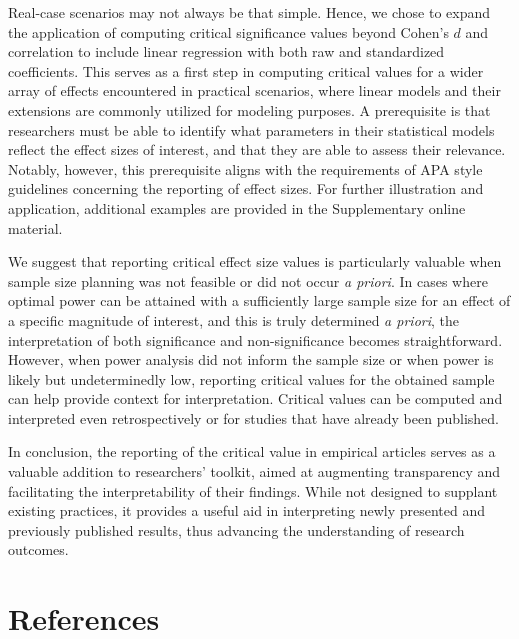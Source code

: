 \documentclass[
  man]{apa7}
\begin{document}
Real-case scenarios may not always be that simple. Hence, we chose to expand the application of computing critical significance values beyond Cohen's \(d\) and correlation to include linear regression with both raw and standardized coefficients. This serves as a first step in computing critical values for a wider array of effects encountered in practical scenarios, where linear models and their extensions are commonly utilized for modeling purposes. A prerequisite is that researchers must be able to identify what parameters in their statistical models reflect the effect sizes of interest, and that they are able to assess their relevance. Notably, however, this prerequisite aligns with the requirements of APA style guidelines concerning the reporting of effect sizes. For further illustration and application, additional examples are provided in the Supplementary online material.

We suggest that reporting critical effect size values is particularly valuable when sample size planning was not feasible or did not occur \textit{a priori}. In cases where optimal power can be attained with a sufficiently large sample size for an effect of a specific magnitude of interest, and this is truly determined \textit{a priori}, the interpretation of both significance and non-significance becomes straightforward. However, when power analysis did not inform the sample size or when power is likely but undeterminedly low, reporting critical values for the obtained sample can help provide context for interpretation. Critical values can be computed and interpreted even retrospectively or for studies that have already been published.

In conclusion, the reporting of the critical value in empirical articles serves as a valuable addition to researchers' toolkit, aimed at augmenting transparency and facilitating the interpretability of their findings. While not designed to supplant existing practices, it provides a useful aid in interpreting newly presented and previously published results, thus advancing the understanding of research outcomes.

\newpage

\hypertarget{references}{%
\section{References}\label{references}}
\end{document}
